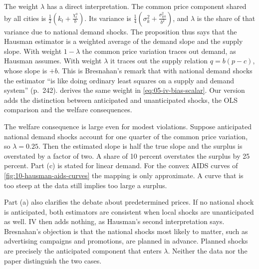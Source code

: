 The weight $\lambda$ has a direct interpretation. The common price component shared by all cities is
$\frac{1}{2}(k_t + \frac{\chi^a_t}{b})$. Its variance is $\frac{1}{4}(\sigma_k^2 + \frac{\sigma_{\chi a}^2}{b^2})$,
and $\lambda$ is the share of that variance due to national demand shocks. The proposition thus says that
the Hausman estimator is a weighted average of the demand slope and the supply slope. With weight
$1 - \lambda$ the common price variation traces out demand, as Hausman assumes. With weight $\lambda$ it
traces out the supply relation $q = b(p - c)$, whose slope is $+b$. This is Bresnahan's remark that with
national demand shocks the estimator ``is like doing ordinary least squares on a supply and demand system''
(p.~242).  derives the same weight in \eqref{eq:05-iv-bias-scalar}. Our version adds the
distinction between anticipated and unanticipated shocks, the OLS comparison and the welfare consequences.

The welfare consequence is large even for modest violations. Suppose anticipated national demand shocks
account for one quarter of the common price variation, so $\lambda = 0.25$. Then the estimated slope is half
the true slope and the surplus is overstated by a factor of two. A share of 10 percent overstates the surplus
by 25 percent. Part (c) is stated for linear demand. For the convex AIDS curves of
\cref{fig:10-hausman-aids-curves} the mapping is only approximate. A curve that is too steep at the data still
implies too large a surplus.

Part (a) also clarifies the debate about predetermined prices. If no national shock is anticipated, both
estimators are consistent when local shocks are unanticipated as well. IV then adds nothing, as Hausman's
second interpretation says. Bresnahan's objection is that the national shocks most likely to matter, such as
advertising campaigns and promotions, are planned in advance. Planned shocks are precisely the anticipated
component that enters $\lambda$. Neither the data nor the paper distinguish the two cases.

